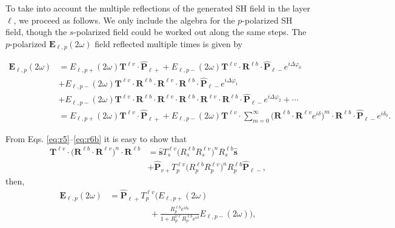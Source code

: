 \documentclass[aps,pra,10pt,amsmath,twocolumn,letterpaper]{revtex4-1}
\begin{document}
To take into account the multiple reflections of the generated SH field in the
layer $\ell$, we proceed as follows. We only include the algebra for the
$p$-polarized SH field, though the $s$-polarized field could be worked out along
the same steps. The $p$-polarized $\mathbf{E}_{\ell,p}(2\omega)$ field reflected
multiple times is given by
\begin{widetext}
\begin{equation*}\label{eq:E2wcomplete}
\begin{split}
\mathbf{E}_{\ell,p}(2\omega) 
&= E_{\ell,p+}(2\omega)\mathbf{T}^{\ell v}\cdot\hat{\mathbf{P}}_{\ell +}
 + E_{\ell,p-}(2\omega)\mathbf{T}^{\ell v}
\cdot\mathbf{R}^{\ell b}\cdot\hat{\mathbf{P}}_{\ell-}e^{i\Delta\varphi_{0}}\\
&+ E_{\ell,p-}(2\omega)\mathbf{T}^{\ell v}
\cdot\mathbf{R}^{\ell b}\cdot\mathbf{R}^{\ell v}
\cdot\mathbf{R}^{\ell b}\cdot\hat{\mathbf{P}}_{\ell-}e^{i\Delta\varphi_{1}}
\\
&+ E_{\ell,p-}(2\omega)\mathbf{T}^{\ell v}
\cdot\mathbf{R}^{\ell b}\cdot\mathbf{R}^{\ell v}
\cdot\mathbf{R}^{\ell b}\cdot\mathbf{R}^{\ell v}
\cdot\mathbf{R}^{\ell b}\cdot\hat{\mathbf{P}}_{\ell-}e^{i\Delta\varphi_{2}}
+\cdots\\
&= E_{\ell,p+}(2\omega)\mathbf{T}^{\ell v}\cdot\hat{\mathbf{P}}_{\ell +}
+ E_{\ell,p-}(2\omega) \mathbf{T}^{\ell v}
\cdot\sum_{m=0}^\infty  
\big(
\mathbf{R}^{\ell b}\cdot\mathbf{R}^{\ell v} 
e^{i\delta}\Big)^m 
\cdot\mathbf{R}^{\ell b}\cdot\hat{\mathbf{P}}_{\ell-}e^{i\delta_{0}}.
\end{split}
\end{equation*}
\end{widetext}
From Eqs. \eqref{eq:r5}--\eqref{eq:r6b} it is easy to show that
\begin{equation*}\label{eq:m1}
\begin{split}
\mathbf{T}^{\ell v}\cdot
\Big(\mathbf{R}^{\ell b}\cdot\mathbf{R}^{\ell v}\Big)^{n}\cdot
\mathbf{R}^{\ell b}
&= \hat{\mathbf{s}}T^{\ell v}_{s}
  \Big(R^{\ell b}_{s}R^{\ell v}_{s}\Big)^{n}R^{\ell b}_{s}\hat{\mathbf{s}}\\
&+ \hat{\mathbf{P}}_{v+}T^{\ell v}_{p}\Big(R^{\ell b}_{p}R^{\ell v}_{p}\Big)^n 
  R^{\ell b}_{p} 
\hat{\mathbf{P}}_{\ell-},
\end{split}
\end{equation*}
then,
\begin{equation*}\label{eq:E2wreduced}
\begin{split}
\mathbf{E}_{\ell,p}(2\omega) 
&= \hat{\mathbf{P}}_{\ell +}T^{\ell v}_{p}
\Big(
E_{\ell,p+}(2\omega)\\
&\hspace{2cm}+
\frac{R^{\ell b}_{p}e^{i\delta_{0}}}{1 + R^{v\ell}_{p}R^{\ell b}_{p}e^{i\delta}}
E_{\ell,p-}(2\omega) 
\Big),
\end{split}
\end{equation*}
\end{document}
